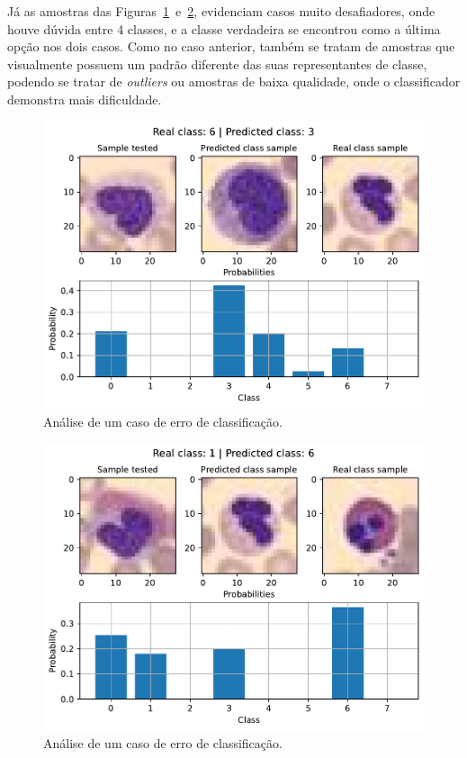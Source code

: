 Já as amostras das Figuras~\ref{fig:error_analyser_35}~e~\ref{fig:error_analyser_1516}, evidenciam casos muito desafiadores, onde houve dúvida entre 4 classes, e a classe verdadeira se encontrou como a última opção nos dois casos. Como no caso anterior, também se tratam de amostras que visualmente possuem um padrão diferente das suas representantes de classe, podendo se tratar de \textit{outliers} ou amostras de baixa qualidade, onde o classificador demonstra mais dificuldade.

\begin{figure}[H]
\centering
\includegraphics[width=0.75\linewidth]{../../plot/cnn_shallow/error_analyser_35}
\caption{Análise de um caso de erro de classificação.}
\label{fig:error_analyser_35}
\end{figure}

\begin{figure}[H]
\centering
\includegraphics[width=0.75\linewidth]{../../plot/cnn_shallow/error_analyser_1516}
\caption{Análise de um caso de erro de classificação.}
\label{fig:error_analyser_1516}
\end{figure}

